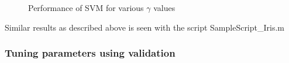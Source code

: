 {\begin{figure}[!ht]
\begin{floatrow}
{ 		}{%
 			\caption{Performance of SVM for various $\gamma$ values}\label{table:3}
 		}
 	\end{floatrow}
 \end{figure}

Similar results as described above is seen with the script SampleScript\_Iris.m

\subsubsection{Tuning parameters using validation}
 \begin{figure}[!ht]
	\begin{floatrow}
\end{floatrow}
\end{figure}}
